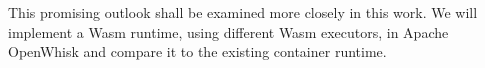 
This promising outlook shall be examined more closely in this work. We will implement a Wasm runtime, using different Wasm executors, in Apache OpenWhisk and compare it to the existing container runtime.